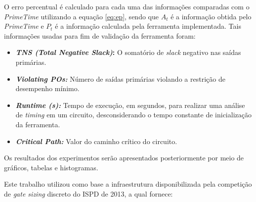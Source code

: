 \documentclass[
	12pt,				%
	openright,			%
	twoside,			%
	a4paper,			%
	english,			%
	french,				%
	spanish,			%
	brazil,				%
	]{abntex2}
\begin{document}
O erro percentual é calculado para cada uma das informações comparadas com o \textit{PrimeTime} utilizando a equação \ref{eq:ep}, sendo que $A_t$ é a informação obtida pelo \textit{PrimeTime} e $P_t$ é a informação calculada pela ferramenta implementada. Tais informações usadas para fim de validação da ferramenta foram:

\begin{itemize}
\item \textbf{\textit{TNS (Total Negative Slack)}: } O somatório de \textit{slack} negativo nas saídas primárias.

\item \textbf{\textit{Violating POs: }} Número de saídas primárias violando a restrição de desempenho mínimo.

\item \textbf{\textit{Runtime (s): }} Tempo de execução, em segundos, para realizar uma análise de \textit{timing} em um circuito, desconsiderando o tempo constante de inicialização da ferramenta.

\item \textbf{\textit{Critical Path: }} Valor do caminho crítico do circuito.
\end{itemize}

Os resultados dos experimentos serão apresentados posteriormente por meio de gráficos, tabelas e histogramas.

Este trabalho utilizou como base a infraestrutura disponibilizada pela competição de \textit{gate sizing} discreto do ISPD de 2013, a qual fornece:
\end{document}
